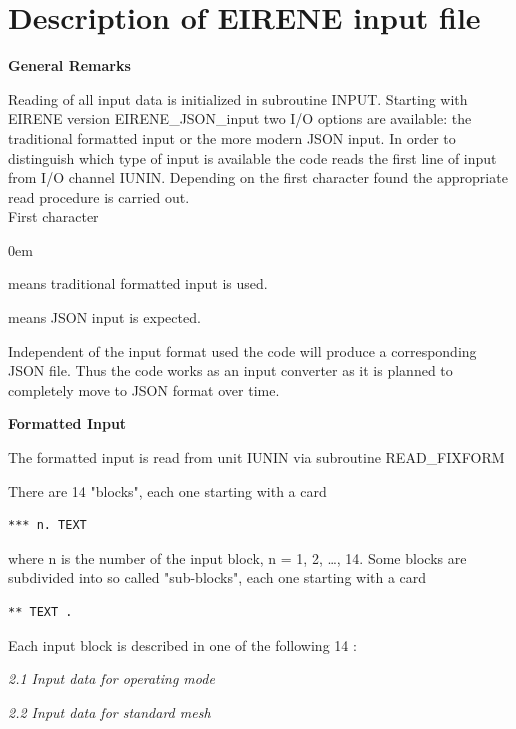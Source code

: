 \chapter{Description of EIRENE input file} \label{sec2}

\textbf{General Remarks} 

\medskip 

Reading of all input data is initialized in subroutine  INPUT. Starting with EIRENE 
version EIRENE\_JSON\_input two I/O options are available: the traditional 
formatted input or the more modern JSON input. In order to distinguish which
type of input is available the code reads the first line of input from I/O channel 
IUNIN. Depending on the first character found the appropriate read procedure is 
carried out. \\
First character 
\begin{description} 
  \itemsep0em
  \item [$= *$] means traditional formatted input is used.
  \item [$= \{$] means JSON input is expected. 
\end{description}
Independent of the input format used the code will produce a corresponding
JSON file. Thus the code works as an input converter as it is planned to completely
move to JSON format over time.

\medskip

\textbf{Formatted Input}

\medskip

The formatted input is read from unit IUNIN via subroutine READ\_FIXFORM

There are 14 "blocks", each one starting with a card 

\begin{lstlisting}
*** n. TEXT
\end{lstlisting} 
where n is the number of the input block, n = 1, 2, \dots, 14.
Some blocks are subdivided into so called "sub-blocks", each one starting with
a card 

\begin{lstlisting}
** TEXT .
\end{lstlisting} 

Each input block is described in one of the following 14
:

\medskip

\textsl{2.1  Input data for operating mode}

\textsl{2.2  Input data for standard mesh}

